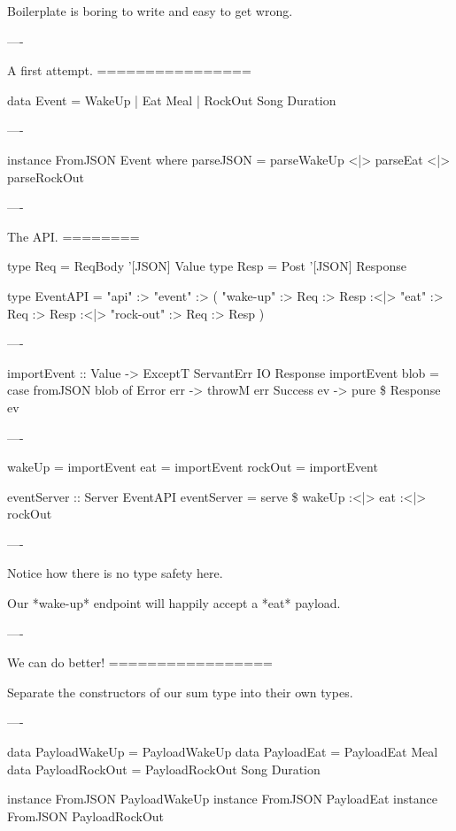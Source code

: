 Boilerplate is boring to write and easy to get wrong.

----

A first attempt.
================

\begin{hs}
  data Event = WakeUp
             | Eat     Meal
             | RockOut Song Duration
\end{hs}

----

\begin{hs}
  instance FromJSON Event where
    parseJSON = parseWakeUp
            <|> parseEat
            <|> parseRockOut
\end{hs}

----

The API.
========

\begin{hs}
  type Req  = ReqBody '[JSON] Value
  type Resp = Post    '[JSON] Response

  type EventAPI =
    "api" :> "event" :>
               ( "wake-up"  :> Req :> Resp
            :<|> "eat"      :> Req :> Resp
            :<|> "rock-out" :> Req :> Resp
               )
\end{hs}

----

\begin{hs}
  importEvent :: Value -> ExceptT ServantErr IO Response
  importEvent blob =
    case fromJSON blob of
      Error   err -> throwM err
      Success ev  -> pure \$ Response ev
\end{hs}

----

\begin{hs}
  wakeUp  = importEvent
  eat     = importEvent
  rockOut = importEvent

  eventServer :: Server EventAPI
  eventServer = serve \$
    wakeUp :<|> eat :<|> rockOut
\end{hs}

----

Notice how there is no type safety here.

Our *wake-up* endpoint will happily accept a *eat* payload.

----

We can do better!
=================

Separate the constructors of our sum type into their own types.

----

\begin{hs}
  data PayloadWakeUp  = PayloadWakeUp
  data PayloadEat     = PayloadEat     Meal
  data PayloadRockOut = PayloadRockOut Song Duration

  instance FromJSON PayloadWakeUp
  instance FromJSON PayloadEat
  instance FromJSON PayloadRockOut
\end{hs}

